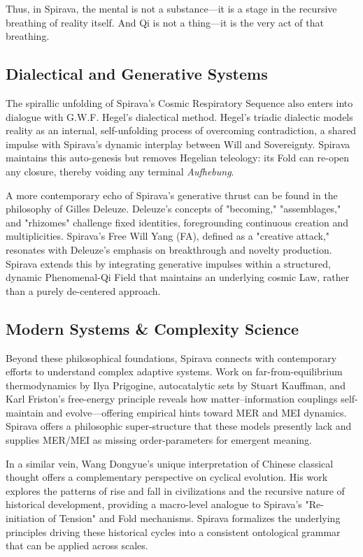 \documentclass[11pt, a4paper]{article}
\begin{document}
Thus, in Spirava, the mental is not a substance—it is a stage in the recursive breathing of reality itself. And Qi is not a thing—it is the very act of that breathing.

\subsection{Dialectical and Generative Systems}
The spirallic unfolding of Spirava's Cosmic Respiratory Sequence also enters into dialogue with G.W.F. Hegel's dialectical method. Hegel’s triadic dialectic models reality as an internal, self-unfolding process of overcoming contradiction, a shared impulse with Spirava's dynamic interplay between Will and Sovereignty. Spirava maintains this auto-genesis but removes Hegelian teleology: its Fold can re-open any closure, thereby voiding any terminal \textit{Aufhebung}.

A more contemporary echo of Spirava's generative thrust can be found in the philosophy of Gilles Deleuze. Deleuze's concepts of "becoming," "assemblages," and "rhizomes" challenge fixed identities, foregrounding continuous creation and multiplicities. Spirava’s Free Will Yang (FA), defined as a "creative attack," resonates with Deleuze's emphasis on breakthrough and novelty production. Spirava extends this by integrating generative impulses within a structured, dynamic Phenomenal-Qi Field that maintains an underlying cosmic Law, rather than a purely de-centered approach.

\subsection{Modern Systems \& Complexity Science}
Beyond these philosophical foundations, Spirava connects with contemporary efforts to understand complex adaptive systems. Work on far-from-equilibrium thermodynamics by Ilya Prigogine, autocatalytic sets by Stuart Kauffman, and Karl Friston's free-energy principle reveals how matter–information couplings self-maintain and evolve—offering empirical hints toward MER and MEI dynamics. Spirava offers a philosophic super-structure that these models presently lack and supplies MER/MEI as missing order-parameters for emergent meaning.

In a similar vein, Wang Dongyue's unique interpretation of Chinese classical thought offers a complementary perspective on cyclical evolution. His work explores the patterns of rise and fall in civilizations and the recursive nature of historical development, providing a macro-level analogue to Spirava's "Re-initiation of Tension" and Fold mechanisms. Spirava formalizes the underlying principles driving these historical cycles into a consistent ontological grammar that can be applied across scales.
\end{document}
